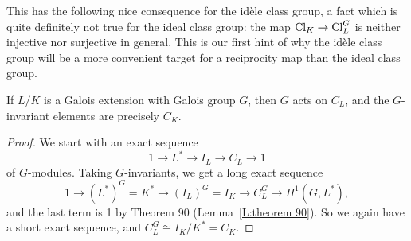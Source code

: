 This has the following nice consequence for the id\`ele class group,
a fact which is quite definitely not true for the ideal class group:
the map $\operatorname{Cl}_K \to \operatorname{Cl}_L^G$ is neither injective nor surjective in general.
This is our first hint of why the id\`ele class group will be a more
convenient target for a reciprocity map than the ideal class group.
\begin{prop}
  If $L/K$ is a Galois extension with Galois group $G$, then
$G$ acts on $C_L$, and the $G$-invariant elements are precisely $C_K$.
\end{prop}
\begin{proof}
We start with an exact sequence
\[
1 \to L^* \to I_L \to C_L \to 1
\]
of $G$-modules. Taking $G$-invariants, we get a long exact sequence
\[
1 \to (L^*)^G = K^* \to (I_L)^G = I_K \to C_L^G \to H^1(G, L^*),
\]
and the last term is 1 by Theorem 90 (Lemma~\ref{L:theorem 90}). So 
we again have a short exact sequence, and $C_L^G \cong I_K/K^* = C_K$.
\end{proof}

%


